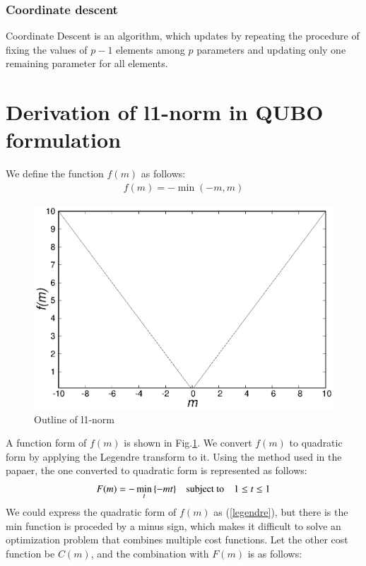 \documentclass[fp,twocolumn]{jpsj3}
\begin{document}
\subsubsection{Coordinate descent}
Coordinate Descent is an algorithm, which updates by repeating the procedure of fixing the values of $p-1$ elements among $p$ parameters and updating only one remaining parameter for all elements.

\section{Derivation of l1-norm in QUBO formulation} %
We define the function $f(m)$ as follows:
\begin{eqnarray}
  f(m)=-\min{(-m,m)}
\end{eqnarray}
\begin{figure}[htbp]
  \begin{center}
    \includegraphics[keepaspectratio,scale=0.50]{absolute.eps}
    \caption{Outline of l1-norm}
    \label{fig:absolute}
  \end{center}
\end{figure}
A function form of $f(m)$ is shown in Fig.\ref{fig:absolute}. We convert $f(m)$ to quadratic form by applying the Legendre transform to it. Using the method used in the papaer, the one converted to quadratic form is represented as follows:
\begin{eqnarray}
  F(m)=-\min_{t}{\{-mt\}} \quad \text{subject to} \quad \-1 \leq t \leq 1 \label{legendre}
\end{eqnarray}
We could express the quadratic form of $f(m)$ as (\ref{legendre}), but there is the min function is proceded by a minus sign, which makes it difficult to solve an optimization problem that combines multiple cost functions. Let the other cost function be $C(m)$, and the combination with $F(m)$ is as follows:
\end{document}
